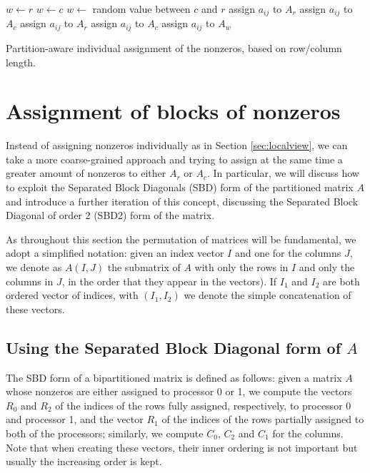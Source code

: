 \begin{algorithm}[h]
	\begin{algorithmic}
		\State
		\State $w \gets r$ 
		\State $w \gets c$
		\Else
		\State $w \gets$ random value between $c$ and $r$
		\EndIf
		\State assign $a_{ij}$ to $A_r$
		\State assign $a_{ij}$ to $A_c$
		\Else
		\State assign $a_{ij}$ to $A_r$
		\State assign $a_{ij}$ to $A_c$
		\Else
		\State assign $a_{ij}$ to $A_w$
		\EndIf
		\EndIf
		\EndFor
	\end{algorithmic}
	\caption{Partition-aware individual assignment of the nonzeros, based on row/column length.} \label{alg:localview-pa}
\end{algorithm}

\section{Assignment of blocks of nonzeros} \label{sec:sbd}

Instead of assigning nonzeros individually as in Section \ref{sec:localview}, we can take a more coarse-grained approach and trying to assign at the same time a greater amount of nonzeros to either $A_r$ or $A_c$. In particular, we will discuss how to exploit the Separated Block Diagonals (SBD) form of the partitioned matrix $A$ and introduce a further iteration of this concept, discussing the Separated Block Diagonal of order 2 (SBD2) form of the matrix.

As throughout this section the permutation of matrices will be fundamental, we adopt a simplified notation: given an index vector $I$ and one for the columns $J$, we denote as $A(I,J)$ the submatrix of $A$ with only the rows in $I$ and only the columns in $J$, in the order that they appear in the vectors). If $I_1$ and $I_2$ are both ordered vector of indices, with $(I_1,I_2)$ we denote the simple concatenation of these vectors.

\subsection{Using the Separated Block Diagonal form of $A$}

The SBD form of a bipartitioned matrix \cite{yzelman_cache} is defined as follows: given a matrix $A$ whose nonzeros are either assigned to processor 0 or 1, we compute the vectors $R_0$ and $R_2$ of the indices of the rows fully assigned, respectively, to processor 0 and processor 1, and the vector $R_1$ of the indices of the rows partially assigned to both of the processors; similarly, we compute $C_0$, $C_2$ and $C_1$ for the columns. Note that when creating these vectors, their inner ordering is not important but usually the increasing order is kept.


